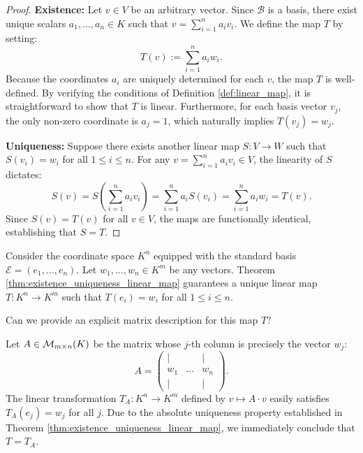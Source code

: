 \begin{proof}
\textbf{Existence:} Let $v \in V$ be an arbitrary vector. Since $\mathcal{B}$ is a basis, there exist unique scalars $a_1, \dots, a_n \in K$ such that $v = \sum_{i=1}^n a_i v_i$. We define the map $T$ by setting:
\begin{equation}
\label{eq:T_def_existence}
T(v) := \sum_{i=1}^n a_i w_i.
\end{equation}
Because the coordinates $a_i$ are uniquely determined for each $v$, the map $T$ is well-defined. By verifying the conditions of Definition \ref{def:linear_map}, it is straightforward to show that $T$ is linear. Furthermore, for each basis vector $v_j$, the only non-zero coordinate is $a_j = 1$, which naturally implies $T(v_j) = w_j$.

\textbf{Uniqueness:} Suppose there exists another linear map $S: V \to W$ such that $S(v_i) = w_i$ for all $1 \le i \le n$. For any $v = \sum_{i=1}^n a_i v_i \in V$, the linearity of $S$ dictates:
\[
S(v) = S\left( \sum_{i=1}^n a_i v_i \right) = \sum_{i=1}^n a_i S(v_i) = \sum_{i=1}^n a_i w_i = T(v).
\]
Since $S(v) = T(v)$ for all $v \in V$, the maps are functionally identical, establishing that $S = T$.
\end{proof}

\begin{example}
\label{ex:linear_map_std_basis}
Consider the coordinate space $K^n$ equipped with the standard basis $\mathcal{E} = (e_1, \dots, e_n)$. Let $w_1, \dots, w_n \in K^m$ be any vectors. Theorem \ref{thm:existence_uniqueness_linear_map} guarantees a unique linear map $T: K^n \to K^m$ such that $T(e_i) = w_i$ for all $1 \le i \le n$.

\begin{question}
Can we provide an explicit matrix description for this map $T$?
\end{question}

\begin{answer}
Let $A \in \mathcal{M}_{m \times n}(K)$ be the matrix whose $j$-th column is precisely the vector $w_j$:
\[
A = 
\begin{pmatrix}
| & & | \\
w_1 & \dots & w_n \\
| & & |
\end{pmatrix}.
\]
The linear transformation $T_A: K^n \to K^m$ defined by $v \mapsto A \cdot v$ easily satisfies $T_A(e_j) = w_j$ for all $j$. Due to the absolute uniqueness property established in Theorem \ref{thm:existence_uniqueness_linear_map}, we immediately conclude that $T = T_A$.
\end{answer}
\end{example}

